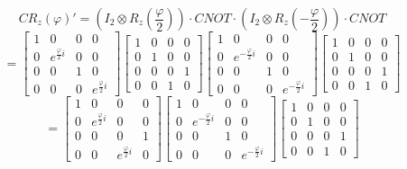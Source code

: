 \documentclass[12pt,a4paper]{article}
\begin{document}
\[
CR_z(\varphi)' = \left(I_2 \otimes R_z\left(\frac{\varphi}{2}\right)\right) \cdot CNOT \cdot \left(I_2 \otimes R_z\left(-\frac{\varphi}{2}\right)\right) \cdot CNOT \]
\[
= 
    \begin{bmatrix}
        1 & 0 & 0 & 0 \\
        0 & e^{\frac{\varphi}{2} i} & 0 & 0 \\
        0 & 0 & 1 & 0 \\
        0 & 0 & 0 & e^{\frac{\varphi}{2} i}
    \end{bmatrix}
    \begin{bmatrix}
        1 & 0 & 0 & 0 \\
        0 & 1 & 0 & 0 \\
        0 & 0 & 0 & 1 \\
        0 & 0 & 1 & 0
    \end{bmatrix}
    \begin{bmatrix}
        1 & 0 & 0 & 0 \\
        0 & e^{-\frac{\varphi}{2} i} & 0 & 0 \\
        0 & 0 & 1 & 0 \\
        0 & 0 & 0 & e^{-\frac{\varphi}{2} i}
    \end{bmatrix}
    \begin{bmatrix}
        1 & 0 & 0 & 0 \\
        0 & 1 & 0 & 0 \\
        0 & 0 & 0 & 1 \\
        0 & 0 & 1 & 0
    \end{bmatrix} \]
    \[
    = 
        \begin{bmatrix}
        1 & 0 & 0 & 0 \\
        0 & e^{\frac{\varphi}{2} i} & 0 & 0 \\
        0 & 0 & 0 & 1 \\
        0 & 0 & e^{\frac{\varphi}{2} i} & 0
    \end{bmatrix}
    \begin{bmatrix}
        1 & 0 & 0 & 0 \\
        0 & e^{-\frac{\varphi}{2} i} & 0 & 0 \\
        0 & 0 & 1 & 0 \\
        0 & 0 & 0 & e^{-\frac{\varphi}{2} i}
    \end{bmatrix}
    \begin{bmatrix}
        1 & 0 & 0 & 0 \\
        0 & 1 & 0 & 0 \\
        0 & 0 & 0 & 1 \\
        0 & 0 & 1 & 0
    \end{bmatrix} \]
\end{document}
